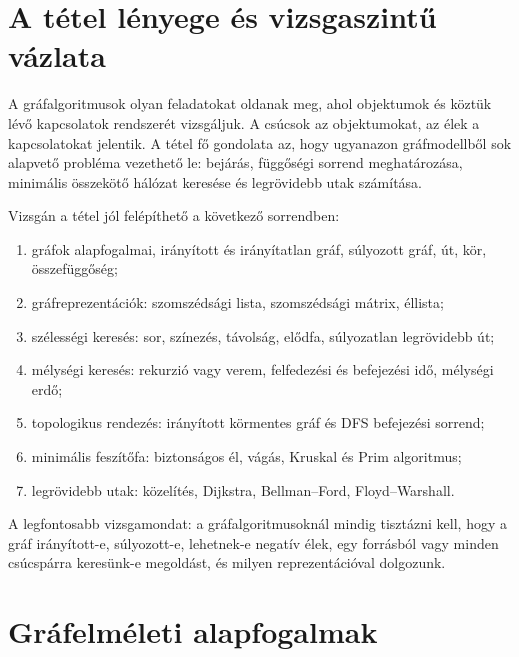 \section{A tétel lényege és vizsgaszintű vázlata}

\begin{summarybox}
A gráfalgoritmusok olyan feladatokat oldanak meg, ahol objektumok és köztük lévő kapcsolatok rendszerét vizsgáljuk. A csúcsok az objektumokat, az élek a kapcsolatokat jelentik. A tétel fő gondolata az, hogy ugyanazon gráfmodellből sok alapvető probléma vezethető le: bejárás, függőségi sorrend meghatározása, minimális összekötő hálózat keresése és legrövidebb utak számítása.
\end{summarybox}

Vizsgán a tétel jól felépíthető a következő sorrendben:

\begin{enumerate}
  \item gráfok alapfogalmai, irányított és irányítatlan gráf, súlyozott gráf, út, kör, összefüggőség;
  \item gráfreprezentációk: szomszédsági lista, szomszédsági mátrix, éllista;
  \item szélességi keresés: sor, színezés, távolság, elődfa, súlyozatlan legrövidebb út;
  \item mélységi keresés: rekurzió vagy verem, felfedezési és befejezési idő, mélységi erdő;
  \item topologikus rendezés: irányított körmentes gráf és DFS befejezési sorrend;
  \item minimális feszítőfa: biztonságos él, vágás, Kruskal és Prim algoritmus;
  \item legrövidebb utak: közelítés, Dijkstra, Bellman--Ford, Floyd--Warshall.
\end{enumerate}

A legfontosabb vizsgamondat: a gráfalgoritmusoknál mindig tisztázni kell, hogy a gráf irányított-e, súlyozott-e, lehetnek-e negatív élek, egy forrásból vagy minden csúcspárra keresünk-e megoldást, és milyen reprezentációval dolgozunk.

\begin{center}

\end{center}

\section{Gráfelméleti alapfogalmak}

